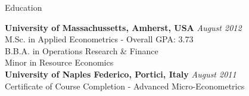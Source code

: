 \documentclass{resume} %
\begin{document}

\begin{rSection}{Education}


{\bf University of Massachussetts, Amherst, USA} \hfill {\em August 2012} \\
M.Sc. in Applied Econometrics - Overall GPA: 3.73 \\
B.B.A. in Operations Research \& Finance \\
Minor in Resource Economics \\

{\bf University of Naples Federico, Portici, Italy} \hfill {\em August 2011} \\
Certificate of Course Completion - Advanced Micro-Econometrics \\

\end{rSection}

\end{document}
